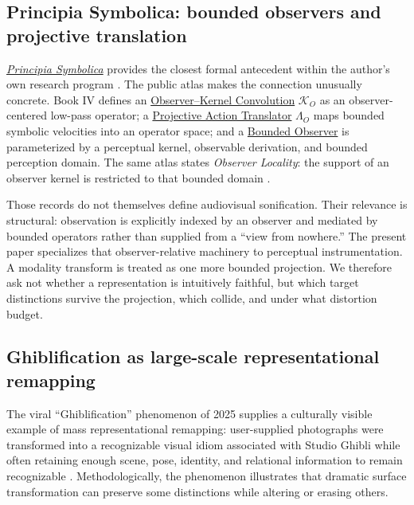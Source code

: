 \documentclass[11pt]{article}
\begin{document}
\subsection{Principia Symbolica: bounded observers and projective translation}
\href{https://paultiffany.github.io/Principia-Symbolica/}{\emph{Principia Symbolica}} provides the closest formal antecedent within the author's own research program \citep{tiffany2026principia}. The public atlas makes the connection unusually concrete. Book IV defines an \href{https://paultiffany.github.io/Principia-Symbolica/atlas/book-iv-de-identitate-symbolica-et-emergentia/page-1/}{Observer--Kernel Convolution} $\mathcal{K}_O$ as an observer-centered low-pass operator; a \href{https://paultiffany.github.io/Principia-Symbolica/atlas/book-iv-de-identitate-symbolica-et-emergentia/page-1/}{Projective Action Translator} $\Lambda_O$ maps bounded symbolic velocities into an operator space; and a \href{https://paultiffany.github.io/Principia-Symbolica/atlas/book-iv-de-identitate-symbolica-et-emergentia/page-1/}{Bounded Observer} is parameterized by a perceptual kernel, observable derivation, and bounded perception domain. The same atlas states \emph{Observer Locality}: the support of an observer kernel is restricted to that bounded domain \citep{tiffany2026principiaBook4}.

Those records do not themselves define audiovisual sonification. Their relevance is structural: observation is explicitly indexed by an observer and mediated by bounded operators rather than supplied from a ``view from nowhere.'' The present paper specializes that observer-relative machinery to perceptual instrumentation. A modality transform is treated as one more bounded projection. We therefore ask not whether a representation is intuitively faithful, but which target distinctions survive the projection, which collide, and under what distortion budget.

\subsection{Ghiblification as large-scale representational remapping}
The viral ``Ghiblification'' phenomenon of 2025 supplies a culturally visible example of mass representational remapping: user-supplied photographs were transformed into a recognizable visual idiom associated with Studio Ghibli while often retaining enough scene, pose, identity, and relational information to remain recognizable \citep{jon2025ghiblification}. Methodologically, the phenomenon illustrates that dramatic surface transformation can preserve some distinctions while altering or erasing others.
\end{document}
